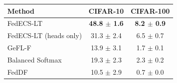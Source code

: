 \begin{tabular}{lcc}
\toprule
Method & CIFAR-10 & CIFAR-100\\
\midrule
FedECS-LT & \textbf{48.8 $\pm$ 1.6} & \textbf{8.2 $\pm$ 0.9}\\
FedECS-LT (heads only) & 31.3 $\pm$ 2.4 & 6.5 $\pm$ 0.7\\
GeFL-F & 13.9 $\pm$ 3.1 & 1.7 $\pm$ 0.1\\
Balanced Softmax & 19.3 $\pm$ 2.3 & 2.3 $\pm$ 0.2\\
FedDF & 10.5 $\pm$ 2.9 & 0.7 $\pm$ 0.0\\
\bottomrule
\end{tabular}
